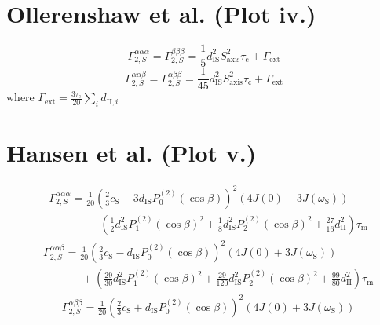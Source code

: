 \begin{appendixtext}
\section{Ollerenshaw et al. (Plot iv.)}
\begin{equation*}
\Gamma_{2,S}^{\alpha\alpha\alpha} = \Gamma_{2,S}^{\beta\beta\beta} = \frac{1}{5} d_{\text{IS}}^2 S_{\text{axis}}^2 \tau_{\text{c}} + \Gamma_{\text{ext}}
\end{equation*}
\begin{equation*}
\Gamma_{2,S}^{\alpha\alpha\beta} = \Gamma_{2,S}^{\alpha\beta\beta} = \frac{1}{45} d_{\text{IS}}^2 S_{\text{axis}}^2 \tau_{\text{c}} + \Gamma_{\text{ext}}
\end{equation*}
where $\Gamma_{\text{ext}} = \frac{3\tau_{\text{c}}}{20}\sum\limits_i d_{\text{II},i}$
\section{Hansen et al. (Plot v.)}
\begin{equation*}
\begin{split}
&\Gamma_{2,S}^{\alpha\alpha\alpha} = \frac{1}{20}\left(\frac{2}{3}c_{\text{S}}-3d_{\text{IS}}P_0^{(2)}(\cos\beta)\right)^2\left(4J(0)+3J(\omega_{\text{S}})\right) \\
&\hspace{41pt}+ \left(\frac{1}{2}d_{\text{IS}}^2P_1^{(2)}(\cos\beta)^2+\frac{1}{8}d_{\text{IS}}^2P_2^{(2)}(\cos\beta)^2+\frac{27}{16}d_{\text{II}}^2\right)\tau_{\text{m}}
\end{split}
\end{equation*}
\begin{equation*}
\begin{split}
&\Gamma_{2,S}^{\alpha\alpha\beta} = \frac{1}{20}\left(\frac{2}{3}c_{\text{S}}-d_{\text{IS}}P_0^{(2)}(\cos\beta)\right)^2\left(4J(0)+3J(\omega_{\text{S}})\right) \\
&\hspace{41pt}+ \left(\frac{29}{30}d_{\text{IS}}^2P_1^{(2)}(\cos\beta)^2+\frac{29}{120}d_{\text{IS}}^2P_2^{(2)}(\cos\beta)^2+\frac{99}{80}d_{\text{II}}^2\right)\tau_{\text{m}}
\end{split}
\end{equation*}
\begin{equation*}
\begin{split}
&\Gamma_{2,S}^{\alpha\beta\beta} = \frac{1}{20}\left(\frac{2}{3}c_{\text{S}}+d_{\text{IS}}P_0^{(2)}(\cos\beta)\right)^2\left(4J(0)+3J(\omega_{\text{S}})\right) \\

\end{split}
\end{equation*}
\end{appendixtext}
